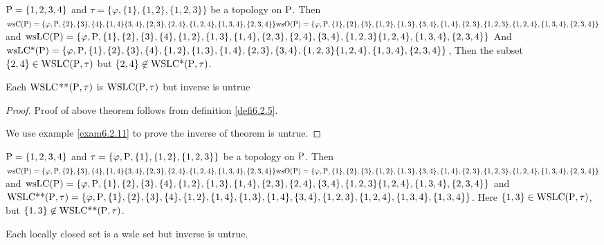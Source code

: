 \begin{exm}\label{exam6.2.9}
$\mathrm{P} = \{1, 2, 3, 4\}$ and $\tau = \{\varphi, \{1\},\{1, 2\}, \{1, 2, 3\}\}$ be a topology on $\mathrm{P}$. Then $\mathrm{ws}\mathrm{C}(\mathrm{P}) = \{\varphi, \mathrm{P}, \{2\}, \{3\}, \{4\},\{1, 4\} \{3,4\}, \{2,3\}, \{2,4\},\{1,2,4\},\{1,3,4\},\{2,3,4\}\} \mathrm{ws}\mathrm{O}(\mathrm{P}) = \{\varphi, \mathrm{P}, \{1\}, \{2\}, \{3\},\{1,2\}, \{1,3\},\{3,4\}, \{1,4\}, \{2,3\}, \{1,2,3\}, \{1,2,4\},\{1,3,4\},\{2,3,4\}\}$ and $\mathrm{ws}\mathrm{L}\mathrm{C}(\mathrm{P})= \{\varphi, \mathrm{P} ,\{1\}, \{2\}, \{3\},\{4\},\{1,2\},\{1,3\}, \{1,4\},\{2,3\}, \{2,4\},\{3,4\}, \{1, 2, 3\}\{1,2,4\},\{1,3,4\},\{2,3,4\}\}$ And $\mathrm{ws}\mathrm{L}\mathrm{C}\text{*}(\mathrm{P})= \{\varphi, \mathrm{P} ,\{1\},\{2\}, \{3\},\{4\},\{1,2\},\{1,3\}, \{1,4\}, \{2,3\},\{3,4\}, \{1, 2, 3\}\{1,2,4\},\{1,3,4\},\{2,3,4\}\}$, Then the subset $\{2,4\} \in \mathrm{WSLC}(\mathrm{P}, \tau)$ but $\{2,4\}\not\in \mathrm{WSLC}\text{*}(\mathrm{P}, \tau)$.
\end{exm}

\begin{thm}\label{thm6.2.10}
Each $\mathrm{WSLC}${*}{*}$(\mathrm{P}, \tau)$ is $\mathrm{WSLC} (\mathrm{P}, \tau)$ but inverse is untrue
\end{thm}

\begin{proof}
Proof of above theorem follows from definition \ref{defi6.2.5}.

We use example \ref{exam6.2.11} to prove the inverse of theorem is untrue.
\end{proof}

\begin{exm}\label{exam6.2.11}
$\mathrm{P} = \{1, 2, 3, 4\}$ and $\tau = \{\varphi, \mathrm{P}, \{1\},\{1, 2\}, \{1, 2, 3\}\}$ be a topology on $\mathrm{P}$. Then $\mathrm{ws}\mathrm{C}(\mathrm{P}) = \{\varphi, \mathrm{P}, \{2\}, \{3\}, \{4\},\{1, 4\} \{3,4\}, \{2,3\}, \{2,4\},\{1,2,4\},\{1,3,4\},\{2,3,4\}\} \mathrm{ws}\mathrm{O}(\mathrm{P}) = \{\varphi, \mathrm{P}, \{1\}, \{2\}, \{3\},\{1,2\}, \{1,3\},\{3,4\}, \{1,4\}, \{2,3\}, \{1,2,3\}, \{1,2,4\},\{1,3,4\},\{2,3,4\}\}$ and $\mathrm{ws}\mathrm{L}\mathrm{C}(\mathrm{P})= \{\varphi, \mathrm{P} ,\{1\}, \{2\}, \{3\},\{4\},\{1,2\},\{1,3\}, \{1,4\}, \{2,3\}, \{2,4\},\{3,4\}, \{1, 2, 3\}\{1,2,4\},\{1,3,4\},\{2,3,4\}\}$ and $\mathrm{WSLC}\text{{*}{*}}(\mathrm{P}, \tau)= \{\varphi, \mathrm{P},\{1\},\{2\}, \{3\},\{4\},\{1,2\},\{1,4\}, \{1,3\}, \{1,4\},\{3,4\}, \{1, 2, 3\},\{1,2,4\},\{1,3,4\},\{1,3,4\}\}$. Here $\{1,3\} \in \mathrm{WSLC} (\mathrm{P}, \tau)$, but $\{1, 3\}\not\in \mathrm{WSLC}\text{{*}{*}}(\mathrm{P}, \tau)$.
\end{exm}

\begin{thm}\label{thm6.2.12}
Each locally closed set is a wslc set but inverse is untrue.
\end{thm}


